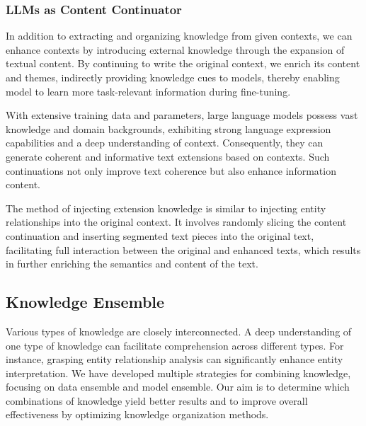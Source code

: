 	
\subsubsection{LLMs as Content Continuator}
\label{sec:llm_as_continuator}

 In addition to extracting and organizing knowledge from given contexts, we can enhance contexts by introducing external knowledge through the expansion of textual content. By continuing to write the original context, we enrich its content and themes, indirectly providing knowledge cues to models, thereby enabling model to learn more task-relevant information during fine-tuning.
 
 With extensive training data and parameters, large language models possess vast knowledge and domain backgrounds, exhibiting strong language expression capabilities and a deep understanding of context. Consequently, they can generate coherent and informative text extensions based on contexts. Such continuations not only improve text coherence but also enhance information content.
 
 The method of injecting extension knowledge is similar to injecting entity relationships into the original context. It involves randomly slicing the content continuation and inserting segmented text pieces into the original text, facilitating full interaction between the original and enhanced texts, which results in further enriching the semantics and content of the text.


\subsection{Knowledge Ensemble}
\label{sec:knowledge_ensemble}
 Various types of knowledge are closely interconnected. A deep understanding of one type of knowledge can facilitate comprehension across different types. For instance, grasping entity relationship analysis can significantly enhance entity interpretation. We have developed multiple strategies for combining knowledge, focusing on data ensemble and model ensemble. Our aim is to determine which combinations of knowledge yield better results and to improve overall effectiveness by optimizing knowledge organization methods.
